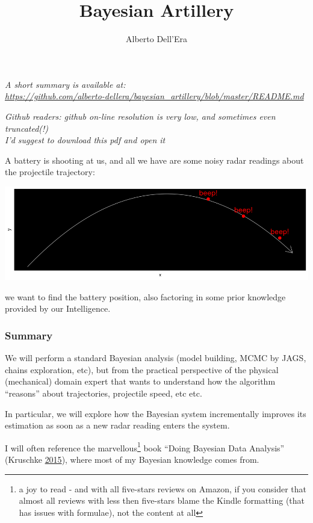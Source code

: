 \documentclass[]{article}
\title{Bayesian Artillery}
\author{Alberto Dell'Era}
\date{}
\begin{document}
\maketitle

\emph{A short summary is available at:\\
\url{https://github.com/alberto-dellera/bayesian_artillery/blob/master/README.md}
}

\emph{Github readers: github on-line resolution is very low, and
sometimes even truncated(!)\\
I'd suggest to download this pdf and open it}

A battery is shooting at us, and all we have are some noisy radar
readings about the projectile trajectory:

\includegraphics{static_images/simulate_cartoon-1.png}

we want to find the battery position, also factoring in some prior
knowledge provided by our Intelligence.

\hypertarget{summary}{%
\subsubsection{Summary}\label{summary}}

We will perform a standard Bayesian analysis (model building, MCMC by
JAGS, chains exploration, etc), but from the practical perspective of
the physical (mechanical) domain expert that wants to understand how the
algorithm ``reasons'' about trajectories, projectile speed, etc etc.

In particular, we will explore how the Bayesian system incrementally
improves its estimation as soon as a new radar reading enters the
system.

I will often reference the marvellous\footnote{a joy to read - and with
  all five-stars reviews on Amazon, if you consider that almost all
  reviews with less then five-stars blame the Kindle formatting (that
  has issues with formulae), not the content at all} book ``Doing
Bayesian Data Analysis'' (Kruschke
\protect\hyperlink{ref-DBDA2E}{2015}), where most of my Bayesian
knowledge comes from.
\end{document}
